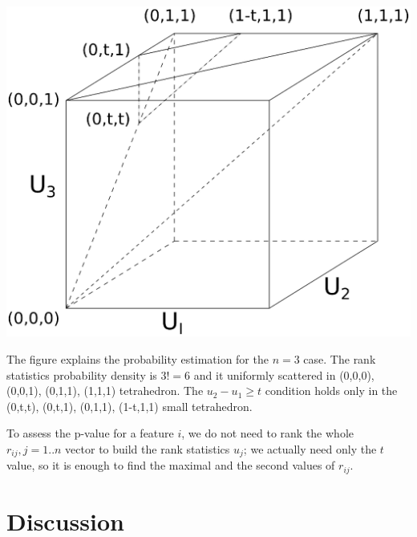 \documentclass{llncs}
\begin{document}
\includegraphics[scale=.5,trim=0 10cm 0 0, clip=true]{rank3d-nocolour}

The figure explains the probability estimation for the $n=3$ case. The rank statistics probability density is $3!=6$ and it uniformly scattered in (0,0,0), (0,0,1), (0,1,1), (1,1,1) tetrahedron. The $u_2 - u_1 \ge t$ condition holds only in the (0,t,t), (0,t,1), (0,1,1), (1-t,1,1) small tetrahedron.

To assess the p-value for a feature $i$, we do not need to rank the whole $r_{ij}, j=1..n$ vector to build the rank statistics $u_j$; we actually need only the $t$ value, so it is enough to find the maximal and the second values of $r_{ij}$.

\section{Discussion}




\end{document}
